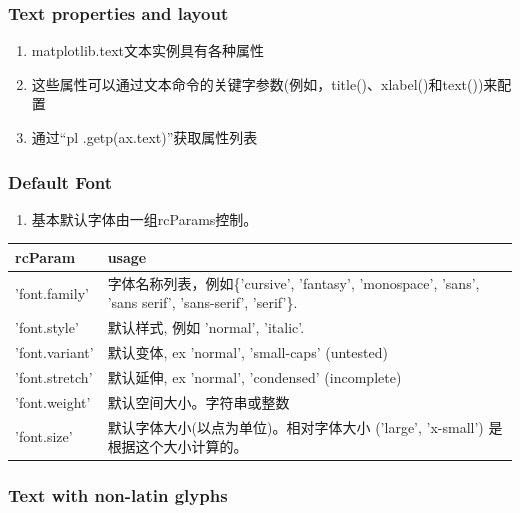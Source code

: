 \documentclass[UTF8,a4paper,12pt]{ctexart}  %
\providecommand{\tightlist}{\setlength{\itemsep}{0pt}\setlength{\parskip}{0pt}}
\begin{document}
\hypertarget{text-properties-and-layout}{%
\subsubsection{Text properties and layout}\label{text-properties-and-layout}}

\begin{enumerate}
\def\labelenumi{\arabic{enumi}.}
\tightlist
\item
  matplotlib.text文本实例具有各种属性
\item
  这些属性可以通过文本命令的关键字参数(例如，title()、xlabel()和text())来配置
\item
  通过``pl .getp(ax.text)''获取属性列表
\end{enumerate}

\hypertarget{default-font}{%
\subsubsection{Default Font}\label{default-font}}

\begin{enumerate}
\def\labelenumi{\arabic{enumi}.}
\tightlist
\item
  基本默认字体由一组rcParams控制。
\end{enumerate}

\begin{longtable}[]{@{}ll@{}}
\toprule
rcParam & usage\tabularnewline
\midrule
\endhead
'font.family' & 字体名称列表，例如\{'cursive', 'fantasy', 'monospace', 'sans', 'sans serif', 'sans-serif', 'serif'\}.\tabularnewline
'font.style' & 默认样式, 例如 'normal', 'italic'.\tabularnewline
'font.variant' & 默认变体, ex 'normal', 'small-caps' (untested)\tabularnewline
'font.stretch' & 默认延伸, ex 'normal', 'condensed' (incomplete)\tabularnewline
'font.weight' & 默认空间大小。字符串或整数\tabularnewline
'font.size' & 默认字体大小(以点为单位)。相对字体大小 ('large', 'x-small') 是根据这个大小计算的。\tabularnewline
\bottomrule
\end{longtable}

\hypertarget{text-with-non-latin-glyphs}{%
\subsubsection{Text with non-latin glyphs}\label{text-with-non-latin-glyphs}}
\end{document}
